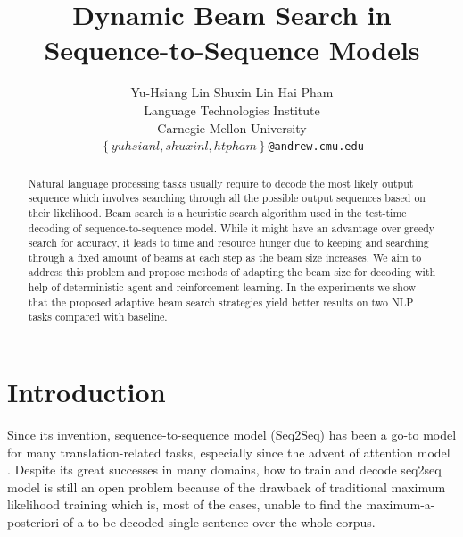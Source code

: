 \documentclass[11pt,a4paper]{article}
\title{Dynamic Beam Search in Sequence-to-Sequence Models}
\author{Yu-Hsiang Lin \quad Shuxin Lin \quad Hai Pham \\
  Language Technologies Institute \\
  Carnegie Mellon University \\
{\tt\small $\left\{yuhsianl, shuxinl, htpham\right\}$@andrew.cmu.edu}
  }
\date{}
\begin{document}
\maketitle
\begin{abstract}
Natural language processing tasks usually require to decode the most likely output sequence which involves searching through all the possible output sequences based on their likelihood. Beam search is a heuristic search algorithm used in the test-time decoding of sequence-to-sequence model. While it might have an advantage over greedy search for accuracy, it leads to time and resource hunger due to keeping and searching through a fixed amount of beams at each step as the beam size increases. We aim to address this problem and propose methods of adapting the beam size for decoding with help of deterministic agent and reinforcement learning. In the experiments we show that the proposed adaptive beam search strategies yield better results on two NLP tasks compared with baseline.
\end{abstract}

\section{Introduction} \label{sec:introduction}
Since its invention, sequence-to-sequence model (Seq2Seq) \cite{seq2seq_2014} has been a go-to model for many translation-related tasks,  %
especially since the advent of attention model \cite{bahdanau2014neural,luong2015effective}. Despite its great successes in many domains, how to train and decode seq2seq model is still an open problem because of the drawback of traditional maximum likelihood training which is, most of the cases, unable to find the maximum-a-posteriori of a to-be-decoded single sentence over the whole corpus. 
\end{document}
